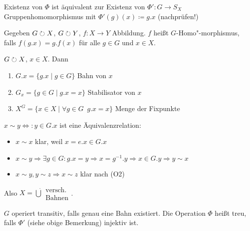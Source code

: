 \documentclass[12pt,a4paper]{scrartcl}
\begin{document}
\begin{bem}
	Existenz von $\Phi$ ist äquivalent zur Existenz von $\Phi'\colon G\to S_X$ Gruppenhomomorphismus mit $\Phi'(g)(x) \coloneqq g.x$ (nachprüfen!)
\end{bem}

\begin{defi}
	Gegeben $G\circlearrowright X$, $G\circlearrowright Y$, $f\colon X\to Y$ Abbildung. $f$ heißt $G$-Homo"-morphismus, falls $f(g.x) = g.f(x)$ für alle $g\in G$ und $x\in X$.
\end{defi}

\begin{defi}
	$G\circlearrowright X$, $x\in X$. Dann\begin{enumerate}
		\item $G.x = \{g.x\mid g\in G\}$ Bahn von $x$
		\item $G_x = \{g\in G\mid g.x = x\}$ Stabilisator von $x$
		\item $X^G = \{x\in X\mid \forall g\in G\enspace g.x = x\}$ Menge der Fixpunkte
	\end{enumerate}
\end{defi}

\begin{bem}
	$x\sim y \Leftrightarrow : y\in G.x$ ist eine Äquivalenzrelation:\begin{itemize}
		\item $x\sim x$ klar, weil $x = e.x\in G.x$
		\item $x\sim y\Rightarrow \exists g\in G: g.x = y\Rightarrow x = g^{-1}.y\Rightarrow x\in G.y\Rightarrow y\sim x$
		\item $x\sim y, y\sim z\Rightarrow x\sim z$ klar nach (O2)
	\end{itemize}
	Also $X=\dot\bigcup\substack{\text{versch.}\\\text{Bahnen}}$.
\end{bem}

\begin{defi}
	$G$ operiert transitiv, falls genau eine Bahn existiert. Die Operation $\Phi$ heißt treu, falls $\Phi'$ (siehe obige Bemerkung) injektiv ist.
\end{defi}
\end{document}
